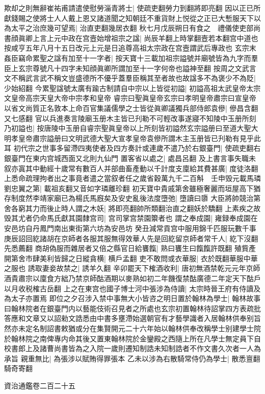 欺却之則無辭崔祐甫請遣使慰勞淄青將士|{
	使疏吏翻勞力到翻將即亮翻}
因以正已所獻錢賜之使將士人人戴上恩又諸道聞之知朝廷不重貨財上悦從之正已大慙服天下以為太平之治庶幾可望焉|{
	治直吏翻幾居衣翻}
秋七月戊辰朔日有食之　禮儀使吏部尚書顔眞卿上言上元中政在宫壼始增祖宗之諡|{
	尚辰羊翻上時掌翻壼若本翻宫中道也按咸亨五年八月十五日改元上元是日追尊高祖太宗政在宫壼謂武后專政也}
玄宗末姦臣竊命累聖之諡有加至十一字者|{
	按天寶十三載加祖宗謚號并廟號皆為九字而羣臣上玄宗尊號凡十四字未知顔眞卿所謂加至十一字何帝也謚神至翻}
按周之文武言文不稱武言武不稱文豈盛德所不優乎蓋羣臣稱其至者故也故諡多不為褒少不為貶|{
	少始紹翻}
今累聖諡號太廣有踰古制請自中宗以上皆從初謚|{
	初謚高祖太武皇帝太宗文皇帝高宗天皇大帝中宗孝和皇帝}
睿宗曰聖眞皇帝玄宗曰孝明皇帝肅宗曰宣皇帝以省文尚質正名敦本上命百官集議儒學之士皆從眞卿議獨兵部侍郎袁傪|{
	傪昌含翻又七感翻}
官以兵進奏言陵廟玉册木主皆已刋勒不可輕改事遂寢不知陵中玉册所刻乃初謚也|{
	按唐陵中玉册自睿宗聖眞皇帝以上所刻皆初謚然玄宗謚册曰至道大聖大明孝皇帝肅宗謚册曰文明武德大聖大宣孝皇帝袁傪所謂木主玉册皆已刋勒有見乎此耳}
初代宗之世事多留滯四夷使者及四方奏計或連歲不遣乃於右銀臺門|{
	使疏吏翻右銀臺門在東内宫城西面又北則九仙門}
置客省以處之|{
	處昌呂翻}
及上書言事失職未叙亦寘其中動經十歲常有數百人并部曲畜產動以千計度支廩給其費甚廣|{
	度徒洛翻}
上悉命疏理拘者出之事竟者遣之當叙者任之歲省穀萬九千二百斛　壬申毁元載馬璘劉忠翼之第|{
	載祖亥翻又音如字璘離珍翻}
初天寶中貴戚第舍雖極奢麗而垣屋高下猶存制度然李靖家廟已為楊氏馬廐矣及安史亂後法度墮弛|{
	墮讀曰隳}
大臣將帥競治第舍各窮其力而後止時人謂之木妖|{
	將即亮翻帥所類翻治直之翻妖於驕翻}
上素疾之故毁其尤者仍命馬氏獻其園隸宫司|{
	宫司掌宫禁園籞者也}
謂之奉成園|{
	雍録奉成園在安邑坊自丹鳳門南出東街第六坊為安邑坊}
癸丑減常貢宫中服用錦千匹服玩數千事　庚辰詔回紇諸胡在京師者各服其服無得效華人先是回紇留京師者常千人|{
	紇下沒翻先悉薦翻}
商胡偽服而雜居者又倍之縣官日給饔餼|{
	熟曰饔生曰餼餼許既翻}
殖貲產開第舍市肆美利皆歸之日縱貪横|{
	横戶孟翻}
吏不敢問或衣華服|{
	衣於既翻華服中華之服也}
誘取妻妾故禁之|{
	誘羊久翻}
辛卯罷天下榷酒收利|{
	唐初無酒禁乾元元年京師酒貴肅宗以廩食方絀乃禁京師酤酒期以麥熟如初二年饑復禁酤廣德二年定天下酤戶以月收税榷古岳翻}
上之在東宫也國子博士河中張涉為侍讀|{
	太宗時晉王府有侍讀及為太子亦置焉}
即位之夕召涉入禁中事無大小皆咨之明日置於翰林為學士|{
	翰林故事曰翰林院者在銀臺門内以藝能伎術召見者之所處也玄宗初置翰林待詔掌四方表疏批答應和文章又以詔勑文誥悉由中書多壅滯始選朝官有才藝學識者入居翰林供奉别旨然亦未定名制詔書敕猶或分在集賢開元二十六年始以翰林供奉改稱學士别建學士院於翰林院之南俾專内命其後又置東翰林院於金鑾殿之西隨上所在凡學士無定員下自校書郎上及諸曹尚書皆為之入院一歲則遷知制誥未知制誥者不作文書久次者一人為承旨}
親重無比|{
	為張涉以賦賄得罪張本}
乙未以涉為右散騎常侍仍為學士|{
	散悉亶翻騎奇寄翻}


資治通鑑卷二百二十五
